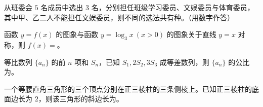 \begin{question}
从班委会 $5$ 名成员中选出 $3$ 名，分别担任班级学习委员、文娱委员与体育委员，其中甲、乙二人不能担任文娱委员，则不同的选法共有\gkblank{}种。（用数字作答）

\end{question}
\begin{question}
函数 $y=f(x)$ 的图象与函数 $y=\log_3x\ (x>0)$ 的图象关于直线 $y=x$ 对称，则 $f(x)=$\gkblank{}。

\end{question}
\begin{question}
等比数列 $\{a_n\}$ 的前 $n$ 项和 $S_n$，已知 $S_1,2S_2,3S_3$ 成等差数列，则 $\{a_n\}$ 的公比为\gkblank{}。

\end{question}
\begin{question}
一个等腰直角三角形的三个顶点分别在正三棱柱的三条侧棱上。已知正三棱柱的底面边长为 $2$，则该三角形的斜边长为\gkblank{}。

\end{question}

